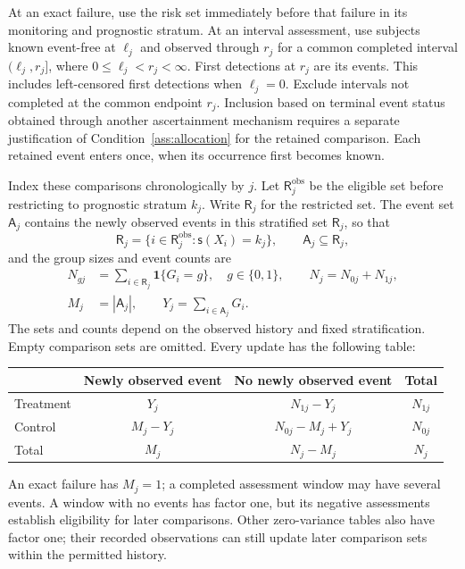 \documentclass[12pt]{article}
\theoremstyle{definition}
\theoremstyle{remark}
\begin{document}
At an exact failure, use the risk set immediately before that failure in its monitoring and prognostic stratum. At an interval assessment, use subjects known event-free at $\ell_j$ and observed through $r_j$ for a common completed interval $(\ell_j,r_j]$, where $0\leq\ell_j<r_j<\infty$. First detections at $r_j$ are its events. This includes left-censored first detections when $\ell_j=0$. Exclude intervals not completed at the common endpoint $r_j$. Inclusion based on terminal event status obtained through another ascertainment mechanism requires a separate justification of Condition~\ref{ass:allocation} for the retained comparison. Each retained event enters once, when its occurrence first becomes known.

Index these comparisons chronologically by $j$. Let $\mathsf R_j^{\mathrm{obs}}$ be the eligible set before restricting to prognostic stratum $k_j$. Write $\mathsf R_j$ for the restricted set. The event set $\mathsf A_j$ contains the newly observed events in this stratified set $\mathsf R_j$, so that
\[
 \mathsf R_j=\{i\in\mathsf R_j^{\mathrm{obs}}:\mathsf s(X_i)=k_j\},
 \qquad \mathsf A_j\subseteq\mathsf R_j,
\]
and the group sizes and event counts are
\begin{equation}
 \begin{aligned}
 N_{gj}&=\sum_{i\in\mathsf R_j}\mathbf 1\{G_i=g\},\quad g\in\{0,1\},
 \qquad N_j=N_{0j}+N_{1j},\\
 M_j&=|\mathsf A_j|,\qquad Y_j=\sum_{i\in\mathsf A_j}G_i.
 \end{aligned}
 \label{eq:update-counts}
\end{equation}
The sets and counts depend on the observed history and fixed stratification. Empty comparison sets are omitted. Every update has the following table:
\begin{center}
\begin{tabular}{lccc}
\toprule
 & Newly observed event & No newly observed event & Total\\
\midrule
Treatment & $Y_j$ & $N_{1j}-Y_j$ & $N_{1j}$\\
Control & $M_j-Y_j$ & $N_{0j}-M_j+Y_j$ & $N_{0j}$\\
\midrule
Total & $M_j$ & $N_j-M_j$ & $N_j$\\
\bottomrule
\end{tabular}
\end{center}
An exact failure has $M_j=1$; a completed assessment window may have several events. A window with no events has factor one, but its negative assessments establish eligibility for later comparisons. Other zero-variance tables also have factor one; their recorded observations can still update later comparison sets within the permitted history.
\end{document}
